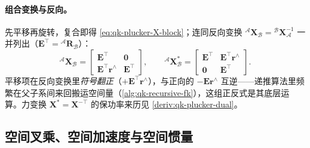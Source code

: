 \paragraph{组合变换与反向。}
先平移再旋转，复合即得 \cref{eq:qk-plucker-X-block}；连同反向变换 ${}^{\mathcal{A}}\mathbf{X}_{\mathcal{B}}={}^{\mathcal{B}}\mathbf{X}_{\mathcal{A}}^{-1}$ 一并列出（$\mathbf{E}^\top={}^{\mathcal{A}}\mathbf{R}_{\mathcal{B}}$）\cite{yu2021quadruped}：
\begin{equation}
  {}^{\mathcal{A}}\mathbf{X}_{\mathcal{B}}=\begin{bmatrix}\mathbf{E}^\top&\mathbf{0}\\\mathbf{E}^\top\boldsymbol{r}^{\wedge}&\mathbf{E}^\top\end{bmatrix},
  \qquad
  {}^{\mathcal{A}}\mathbf{X}_{\mathcal{B}}^{*}=\begin{bmatrix}\mathbf{E}^\top&\mathbf{E}^\top\boldsymbol{r}^{\wedge}\\\mathbf{0}&\mathbf{E}^\top\end{bmatrix}.
  \label{eq:qk-plucker-X-rev}
\end{equation}
平移项在反向变换里\emph{符号翻正}（$+\mathbf{E}^\top\boldsymbol{r}^{\wedge}$），与正向的 $-\mathbf{E}\boldsymbol{r}^{\wedge}$ 互逆——递推算法里频繁在父子系间来回搬运空间量（\cref{alg:qk-recursive-fk}），这组正反式是其底层运算。力变换 $\mathbf{X}^{*}=\mathbf{X}^{-\top}$ 的保功率来历见 \cref{deriv:qk-plucker-dual}。

\subsection{空间叉乘、空间加速度与空间惯量}
\label{subsec:qk-spatial-rest}

